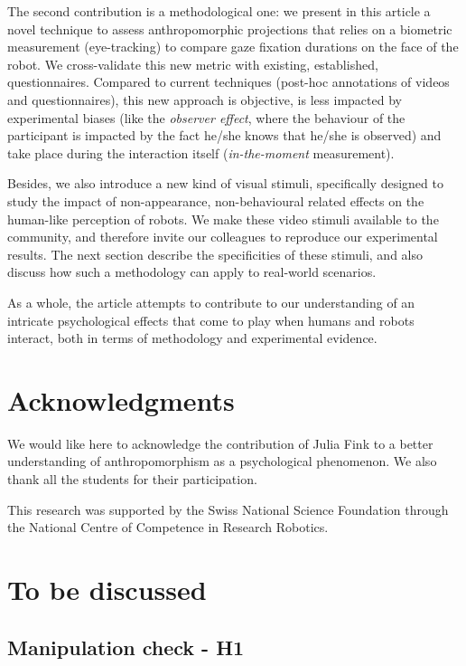 \documentclass[lettersize, noapacite, twoside, HRI]{apa_HRI}
\begin{document}
The second contribution is a methodological one: we present in this article
a novel technique to assess anthropomorphic projections that relies on a
biometric measurement (eye-tracking) to compare gaze fixation durations on
the face of the robot. We cross-validate this new metric with existing,
established, questionnaires. Compared to current techniques (post-hoc
annotations of videos and questionnaires), this new approach is objective,
is less impacted by experimental biases (like the \emph{observer effect},
where the behaviour of the participant is impacted by the fact he/she knows that
he/she is observed) and take place during the interaction itself
(\emph{in-the-moment} measurement).

Besides, we also introduce a new kind of visual stimuli, specifically designed
to study the impact of non-appearance, non-behavioural related effects on the
human-like perception of robots. We make these video stimuli available to the
community, and therefore invite our colleagues to reproduce our experimental
results. The next section describe the specificities of these stimuli, and also
discuss how such a methodology can apply to real-world scenarios.

As a whole, the article attempts to contribute to our understanding of an
intricate psychological effects that come to play when humans and robots
interact, both in terms of methodology and experimental evidence.


\section*{Acknowledgments}

We would like here to acknowledge the contribution of Julia Fink to a better
understanding of anthropomorphism as a psychological phenomenon. We also thank
all the students for their participation.

This research was supported by the Swiss National Science Foundation through the
National Centre of Competence in Research Robotics.

\newpage


\section {To be discussed}


\subsection{Manipulation check - H1}
\end{document}
